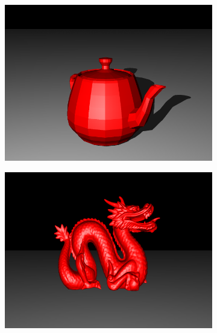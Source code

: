 \documentclass{article}
\begin{document}
\begin{figure}[hb]
  \begin{subfigure}{0.45\textwidth}
    \includegraphics[width=1\textwidth]{images/obj1.png}
  \end{subfigure}
  \begin{subfigure}{0.45\textwidth}
    \includegraphics[width=1\textwidth]{images/obj2.png}
  \end{subfigure}


\end{figure}
\end{document}
